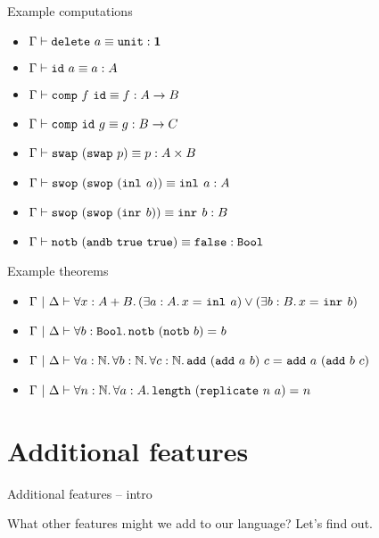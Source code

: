 \documentclass{beamer}
\begin{document}
\begin{frame}{Example computations}

\begin{itemize}
  \item $\compeq{\delete[a]}{\unit}{\Unit}$
  \item $\compeq{\id[a]}{a}{A}$
  \item $\compeq{\comp[f][\id]}{f}{\Fun{A}{B}}$
  \item $\compeq{\comp[\id][g]}{g}{\Fun{B}{C}}$
  \item $\compeq{\swap[(\swap[p])]}{p}{\Prod{A}{B}}$
  \item $\compeq{\swop[(\swop[(\inl{a})])]}{\inl{a}}{A}$
  \item $\compeq{\swop[(\swop[(\inr{b})])]}{\inr{b}}{B}$
  \item $\compeq{\notb[(\andb[\btrue][\btrue])]}{\bfalse}{\Bool}$
\end{itemize}

\end{frame}

\begin{frame}{Example theorems}

\begin{itemize}
  \item $\holds{\All{x}[\Sum{A}{B}]{\Or{(\Ex{a}[A]{\Eq{x}{\inl{a}}})}{(\Ex{b}[B]{\Eq{x}{\inr{b}}})}}}$
  \item $\holds{\All{b}[\Bool]{\Eq{\notb[(\notb[b])]}{b}}}$
  \item $\holds{\All{a}[\Nat]{\All{b}[\Nat]{\All{c}[\Nat]{\Eq{\add[(\add[a][b])][c]}{\add[a][(\add[b][c])]}}}}}$
  \item $\holds{\All{n}[\Nat]{\All{a}[A]{\Eq{\length[(\replicate[n][a])]}{n}}}}$
\end{itemize}

\end{frame}

\section{Additional features}

\begin{frame}{Additional features -- intro}

What other features might we add to our language? Let's find out.

\end{frame}
\end{document}
